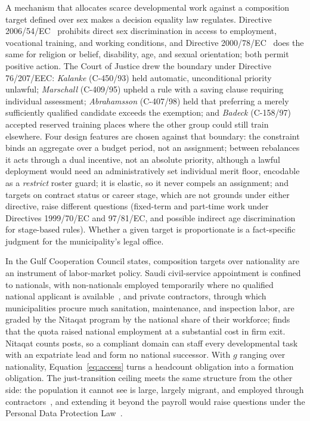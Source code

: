 \documentclass[utf8]{frontiers_suppmat}
\begin{document}
A mechanism that allocates scarce developmental work against a composition target defined over sex makes a decision equality law regulates. Directive 2006/54/EC~\citep{EUGender2006} prohibits direct sex discrimination in access to employment, vocational training, and working conditions, and Directive 2000/78/EC~\citep{EUEmployment2000} does the same for religion or belief, disability, age, and sexual orientation; both permit positive action. The Court of Justice drew the boundary under Directive 76/207/EEC: \textit{Kalanke} (C-450/93) held automatic, unconditional priority unlawful; \textit{Marschall} (C-409/95) upheld a rule with a saving clause requiring individual assessment; \textit{Abrahamsson} (C-407/98) held that preferring a merely sufficiently qualified candidate exceeds the exemption; and \textit{Badeck} (C-158/97) accepted reserved training places where the other group could still train elsewhere. Four design features are chosen against that boundary: the constraint binds an aggregate over a budget period, not an assignment; between rebalances it acts through a dual incentive, not an absolute priority, although a lawful deployment would need an administratively set individual merit floor, encodable as a \textit{restrict} roster guard; it is elastic, so it never compels an assignment; and targets on contract status or career stage, which are not grounds under either directive, raise different questions (fixed-term and part-time work under Directives 1999/70/EC and 97/81/EC, and possible indirect age discrimination for stage-based rules). Whether a given target is proportionate is a fact-specific judgment for the municipality's legal office.

In the Gulf Cooperation Council states, composition targets over nationality are an instrument of labor-market policy. Saudi civil-service appointment is confined to nationals, with non-nationals employed temporarily where no qualified national applicant is available~\citep{SaudiCSL1977}, and private contractors, through which municipalities procure much sanitation, maintenance, and inspection labor, are graded by the Nitaqat program by the national share of their workforce; \citet{Peck2017} finds that the quota raised national employment at a substantial cost in firm exit. Nitaqat counts posts, so a compliant domain can staff every developmental task with an expatriate lead and form no national successor. With $g$ ranging over nationality, Equation~\eqref{eq:access} turns a headcount obligation into a formation obligation. The just-transition ceiling meets the same structure from the other side: the population it cannot see is large, largely migrant, and employed through contractors~\citep{ILOESCWA2026}, and extending it beyond the payroll would raise questions under the Personal Data Protection Law~\citep{SaudiPDPL2021}.
\end{document}
